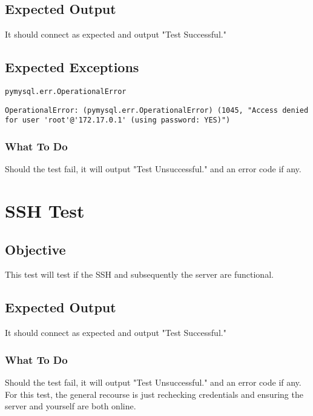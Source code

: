 \documentclass[12pt]{article}
\begin{document}
\subsection{Expected Output}

It should connect as expected and output "Test Successful."

\subsection{Expected Exceptions}

\begin{verbatim}
pymysql.err.OperationalError
\end{verbatim}

\begin{lstlisting}
OperationalError: (pymysql.err.OperationalError) (1045, "Access denied for user 'root'@'172.17.0.1' (using password: YES)")
\end{lstlisting}

\subsubsection{What To Do}

Should the test fail, it will output "Test Unsuccessful." and an error code if any.

\section{SSH Test}

\subsection{Objective}

This test will test if the SSH and subsequently the server are functional.

\subsection{Expected Output}

It should connect as expected and output "Test Successful."

\subsubsection{What To Do}

Should the test fail, it will output "Test Unsuccessful." and an error code if any. For this test, the general recourse is just rechecking credentials and ensuring the server and yourself are both online.
\end{document}
